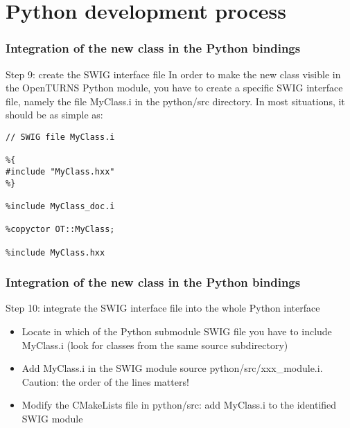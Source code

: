 \documentclass[8pt]{beamer}
\begin{document}
\section[Python development process]{Python development process}
\begin{frame}[fragile]
  \frametitle{Integration of the new class in the Python bindings}
  \begin{block}{Step 9: create the SWIG interface file}
    In order to make the new class visible in the OpenTURNS Python module, you have to create a specific SWIG interface file, namely the file MyClass.i in the python/src directory. In most situations, it should be as simple as:
    \small

    \begin{lstlisting}
// SWIG file MyClass.i

%{
#include "MyClass.hxx"
%}

%include MyClass_doc.i

%copyctor OT::MyClass;

%include MyClass.hxx

\end{lstlisting}
    
    \normalsize
  \end{block}
\end{frame}
\begin{frame}
  \frametitle{Integration of the new class in the Python bindings}
  \begin{block}{Step 10: integrate the SWIG interface file into the whole Python interface}
    \begin{itemize}
    \item Locate in which of the Python submodule SWIG file you have to include MyClass.i (look for classes from the same source subdirectory) 
    \item Add MyClass.i in the SWIG module source python/src/xxx\_module.i. Caution: the order of the lines matters!
    \item Modify the CMakeLists file in python/src: add MyClass.i to the identified SWIG module
    \end{itemize}
  \end{block}
\end{frame}
\end{document}
